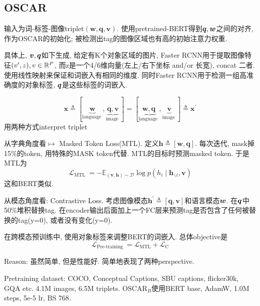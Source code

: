 \documentclass{article}
\begin{document}
\subsection{OSCAR}

输入为词-标签-图像triplet$(\boldsymbol{w}, \boldsymbol{q}, \boldsymbol{v})$. 使用pretrained-BERT得到$\boldsymbol{q}, \boldsymbol{w}$之间的对齐, 作为OSCAR的初始化; 被检测出tag的图像区域也有高的初始注意力权重.

具体上, $\boldsymbol{v}, \boldsymbol{q}$如下生成, 给定有K个对象区域的图片, Faster RCNN用于提取图像特征$(v',z), v\in \mathbb{R}^P$, 而z是一个4/6维向量(左上/右下坐标 and/or 长宽), concat 二者. 使用线性映射来保证和词嵌入有相同的维度. 同时Faster RCNN用于检测一组高准确度的对象标签, $\boldsymbol{q}$是这些标签的词嵌入.

\begin{equation}
    \boldsymbol{x} \triangleq[\underbrace{\boldsymbol{w}}_{\text {language }}, \underbrace{\boldsymbol{q}, \boldsymbol{v}}_{\text {image }}]=[\underbrace{\boldsymbol{w}, \boldsymbol{q}}_{\text {language }}, \underbrace{\boldsymbol{v}}_{\text {image }}] \triangleq \boldsymbol{x}^{\prime}
\end{equation}
用两种方式interpret triplet

从字典角度看$\mapsto$ Masked Token Loss(MTL). 定义$\boldsymbol{h} \triangleq[\boldsymbol{w}, \boldsymbol{q}]$. 每次迭代, mask掉15\%的token, 用特殊的MASK token代替. MTL的目标时预测masked token. 于是MTL为
\begin{equation}
    \mathcal{L}_{\text {MTL }}=-\mathbb{E}_{(\boldsymbol{v}, \boldsymbol{h}) \sim \mathcal{D}} \log p\left(h_{i} \mid \boldsymbol{h}_{\backslash i}, \boldsymbol{v}\right)
\end{equation}
这和BERT类似.

从模态角度看: Contrastive Loss. 考虑图像模态$\boldsymbol{h}^{\prime} \triangleq[\boldsymbol{q}, \boldsymbol{v}]$和语言模态$\boldsymbol{w}$. 在$\boldsymbol{q}$中50\%堆积替换tag. 在encoder输出后面加上一个FC层来预测tag是否包含了任何被替换的tag(y=0), 或者没有变化(y=0).

在跨模态预训练中, 使用对象标签来调整BERT的词嵌入. 总体objective是
\begin{equation}
    \mathcal{L}_{\text {Pre-training }}=\mathcal{L}_{\mathrm{MTL}}+\mathcal{L}_{\mathrm{C}}
\end{equation}

Reason: 虽然简单, 但是性能好. 简单地表现了两种perspective.

Pretraining dataset: COCO, Conceptual Captions, SBU captions, flicker30k, GQA etc. 4.1M images, 6.5M triplets. $\text{OSCAR}_B$使用BERT base, AdamW, 1.0M steps, 5e-5 lr, BS 768.
\end{document}
